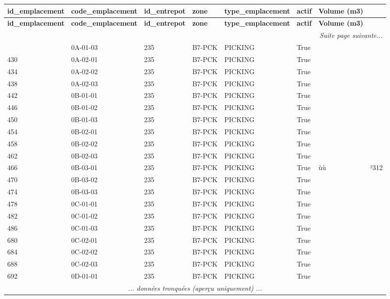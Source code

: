 \documentclass[a4paper,11pt]{article}
\begin{document}
\begin{landscape}
\tiny
\begin{longtable}{|l|l|l|l|l|l|l|l|}
\hline
\rowcolor{headerblue}
\textbf{id\_emplacement} & \textbf{code\_emplacement} & \textbf{id\_entrepot} & \textbf{zone} & \textbf{type\_emplacement} & \textbf{actif} & \textbf{Volume (m3)} & \textbf{} \\ \hline
\endfirsthead
\hline
\rowcolor{headerblue}
\textbf{id\_emplacement} & \textbf{code\_emplacement} & \textbf{id\_entrepot} & \textbf{zone} & \textbf{type\_emplacement} & \textbf{actif} & \textbf{Volume (m3)} & \textbf{} \\ \hline
\endhead
\hline \multicolumn{8}{|r|}{\textit{Suite page suivante...}} \\ \hline
\endfoot
\hline
\endlastfoot
 426 & 0A-01-03 & 235 & B7-PCK & PICKING & True &  &  \\ \hline
\rowcolor{rowgray} 430 & 0A-02-01 & 235 & B7-PCK & PICKING & True &  &  \\ \hline
 434 & 0A-02-02 & 235 & B7-PCK & PICKING & True &  &  \\ \hline
\rowcolor{rowgray} 438 & 0A-02-03 & 235 & B7-PCK & PICKING & True &  &  \\ \hline
 442 & 0B-01-01 & 235 & B7-PCK & PICKING & True &  &  \\ \hline
\rowcolor{rowgray} 446 & 0B-01-02 & 235 & B7-PCK & PICKING & True &  &  \\ \hline
 450 & 0B-01-03 & 235 & B7-PCK & PICKING & True &  &  \\ \hline
\rowcolor{rowgray} 454 & 0B-02-01 & 235 & B7-PCK & PICKING & True &  &  \\ \hline
 458 & 0B-02-02 & 235 & B7-PCK & PICKING & True &  &  \\ \hline
\rowcolor{rowgray} 462 & 0B-02-03 & 235 & B7-PCK & PICKING & True &  &  \\ \hline
 466 & 0B-03-01 & 235 & B7-PCK & PICKING & True & ùù & ²312 \\ \hline
\rowcolor{rowgray} 470 & 0B-03-02 & 235 & B7-PCK & PICKING & True &  &  \\ \hline
 474 & 0B-03-03 & 235 & B7-PCK & PICKING & True &  &  \\ \hline
\rowcolor{rowgray} 478 & 0C-01-01 & 235 & B7-PCK & PICKING & True &  &  \\ \hline
 482 & 0C-01-02 & 235 & B7-PCK & PICKING & True &  &  \\ \hline
\rowcolor{rowgray} 486 & 0C-01-03 & 235 & B7-PCK & PICKING & True &  &  \\ \hline
 680 & 0C-02-01 & 235 & B7-PCK & PICKING & True &  &  \\ \hline
\rowcolor{rowgray} 684 & 0C-02-02 & 235 & B7-PCK & PICKING & True &  &  \\ \hline
 688 & 0C-02-03 & 235 & B7-PCK & PICKING & True &  &  \\ \hline
\rowcolor{rowgray} 692 & 0D-01-01 & 235 & B7-PCK & PICKING & True &  &  \\ \hline
\multicolumn{8}{|c|}{\textit{... données tronquées (aperçu uniquement) ...}} \\ \hline
\end{longtable}
\end{landscape}
\normalsize
\end{document}
